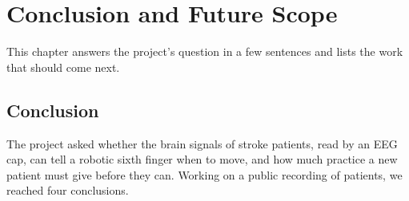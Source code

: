 \chapter{Conclusion and Future Scope}\label{ch:conclusion}

This chapter answers the project's question in a few sentences and lists the work that
should come next.

\section{Conclusion}\label{sec:conclusion}

The project asked whether the brain signals of stroke patients, read by an EEG cap, can
tell a robotic sixth finger when to move, and how much practice a new patient must give
before they can. Working on a public recording of \nSubjects{} patients, we reached four
conclusions.

